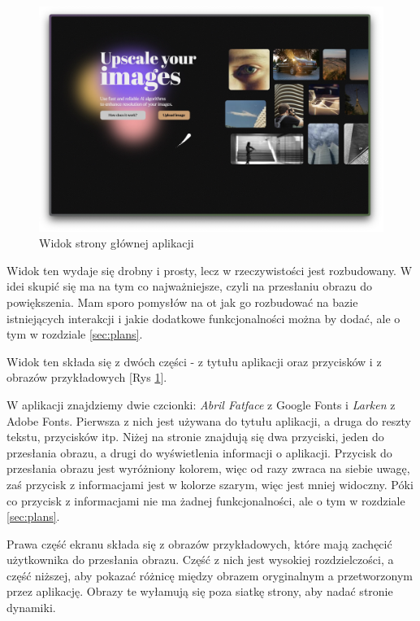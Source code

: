 \begin{figure}[H]
    \centering
    \includegraphics[width=\linewidth]{Rozdziały/06.Aplikacja/Obrazy/kursor-move.jpg}  
    \caption{Widok strony głównej aplikacji}
    \label{fig:image88}
\end{figure}

Widok ten wydaje się drobny i prosty, lecz w rzeczywistości jest rozbudowany. W idei skupić się ma na tym co najważniejsze, czyli na przesłaniu obrazu do powiększenia. Mam sporo pomysłów na ot jak go rozbudować na bazie istniejących interakcji i jakie dodatkowe funkcjonalności można by dodać, ale o tym w rozdziale \ref{sec:plans}.

Widok ten składa się z dwóch części - z tytułu aplikacji oraz przycisków i z obrazów przykładowych [Rys \ref{fig:image88}]. 

W aplikacji znajdziemy dwie czcionki: \textit{Abril Fatface} z Google Fonts i \textit{Larken} z Adobe Fonts. Pierwsza z nich jest używana do tytułu aplikacji, a druga do reszty tekstu, przycisków itp.
Niżej na stronie znajdują się dwa przyciski, jeden do przesłania obrazu, a drugi do wyświetlenia informacji o aplikacji. Przycisk do przesłania obrazu jest wyróżniony kolorem, więc od razy zwraca na siebie uwagę, zaś przycisk z informacjami jest w kolorze szarym, więc jest mniej widoczny. Póki co przycisk z informacjami nie ma żadnej funkcjonalności, ale o tym w rozdziale \ref{sec:plans}. 

Prawa część ekranu składa się z obrazów przykładowych, które mają zachęcić użytkownika do przesłania obrazu. Część z nich jest wysokiej rozdzielczości, a część niższej, aby pokazać różnicę między obrazem oryginalnym a przetworzonym przez aplikację. Obrazy te wyłamują się poza siatkę strony, aby nadać stronie dynamiki.

